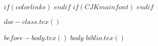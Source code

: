 $if(colorlinks)$
$endif$
$if(CJKmainfont)$
$endif$

$doc-class.tex()$


$before-body.tex()$
$body$
$biblio.tex()$


